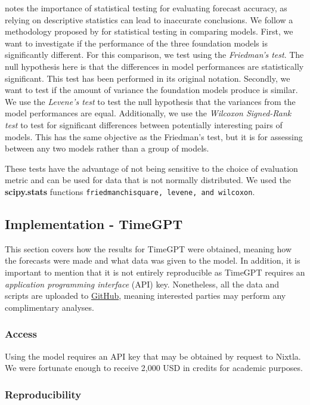 \documentclass[12pt,a4paper]{article}
\begin{document}
\cite{Koning2005} notes the importance of statistical testing for evaluating forecast accuracy, as relying on descriptive statistics can lead to inaccurate conclusions. We follow a methodology proposed by \cite{Rainio2024} for statistical testing in comparing models. First, we want to investigate if the performance of the three foundation models is significantly different. For this comparison, we test using the \textit{Friedman’s test}. The null hypothesis here is that the differences in model performances are statistically significant. This test has been performed in its original notation. Secondly, we want to test if the amount of variance the foundation models produce is similar. We use the \textit{Levene’s test} to test the null hypothesis that the variances from the model performances are equal. Additionally, we use the \textit{Wilcoxon Signed-Rank test} to test for significant differences between potentially interesting pairs of models. This has the same objective as the Friedman’s test, but it is for assessing between any two models rather than a group of models. 


These tests have the advantage of not being sensitive to the choice of evaluation metric and can be used for data that is not normally distributed. We used the \textbf{scipy.stats} functions \texttt{friedmanchisquare, levene, and wilcoxon}.

\subsection{Implementation - TimeGPT}

This section covers how the results for TimeGPT were obtained, meaning how the forecasts were made and what data was given to the model. In addition, it is important to mention that it is not entirely reproducible as TimeGPT requires an \textit{application programming interface} (API) key. Nonetheless, all the data and scripts are uploaded to \href{https://github.com/tom-alten/Outsmarting-Time/}{GitHub}, meaning interested parties may perform any complimentary analyses.  

\subsubsection{Access}

Using the model requires an API key that may be obtained by request to Nixtla. We were fortunate enough to receive 2,000 USD in credits for academic purposes. 

\subsubsection{Reproducibility}
\end{document}
